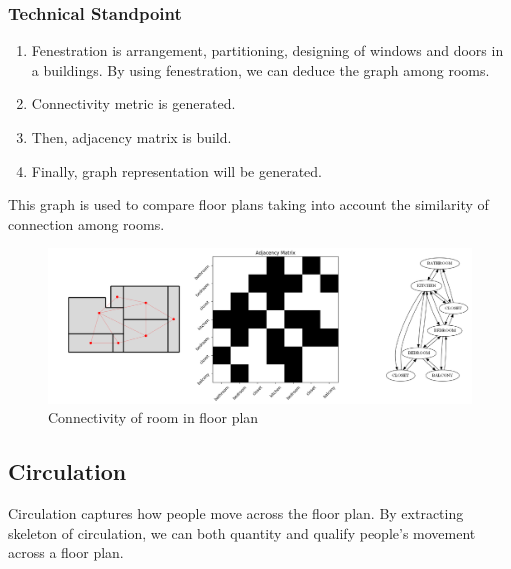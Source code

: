                         \subsubsection{Technical Standpoint}
                                \begin{enumerate}[label=\alph*.]
                                        \item Fenestration is arrangement, partitioning, designing of windows and doors in a buildings. By using fenestration, we can deduce the graph among rooms. 
                                        \item Connectivity metric is generated.
                                        \item Then, adjacency matrix is build.
                                        \item Finally, graph representation will be generated.
                                \end{enumerate}
                                This graph is used to compare floor plans taking into account the similarity of connection among rooms.
                        
                        \begin{figure}[h]
                                \centering
                                \includegraphics[width=1\textwidth]{img/chapter_6/connectivity.png}
                                \caption{Connectivity of room in floor plan}
                                \label{fig:Connectivity of room in floor plan}
                        \end{figure}
                \pagebreak
                \subsection{Circulation}
                        Circulation captures how people move across the floor plan. By extracting skeleton of circulation, we can both quantity and qualify people's movement across a floor plan. 


